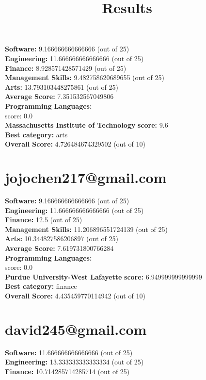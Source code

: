 \documentclass{article}
\title{Results}
\begin{document}
\section{}
\textbf{Software:} 9.166666666666666 (out of 25)\\
\textbf{Engineering: } 11.666666666666666 (out of 25)\\
\textbf{Finance:} 8.928571428571429 (out of 25)\\
\textbf{Management Skills:} 9.482758620689655 (out of 25)\\
\textbf{Arts:} 13.793103448275861 (out of 25)\\
\textbf{Average Score: } 7.351532567049806\\
\textbf{Programming Languages:} \\
score: 0.0\\
\textbf{Massachusetts Institute of Technology} \textbf{score:} 9.6\\
\textbf{Best category: } arts\\
\textbf{Overall Score: }4.726484674329502 (out of 10)\section{jojochen217@gmail.com}
\textbf{Software:} 9.166666666666666 (out of 25)\\
\textbf{Engineering: } 11.666666666666666 (out of 25)\\
\textbf{Finance:} 12.5 (out of 25)\\
\textbf{Management Skills:} 11.206896551724139 (out of 25)\\
\textbf{Arts:} 10.344827586206897 (out of 25)\\
\textbf{Average Score: } 7.619731800766284\\
\textbf{Programming Languages:} \\
score: 0.0\\
\textbf{Purdue University-West Lafayette} \textbf{score:} 6.949999999999999\\
\textbf{Best category: } finance\\
\textbf{Overall Score: }4.435459770114942 (out of 10)\section{david245@gmail.com}
\textbf{Software:} 11.666666666666666 (out of 25)\\
\textbf{Engineering: } 13.333333333333334 (out of 25)\\
\textbf{Finance:} 10.714285714285714 (out of 25)\\
\end{document}
